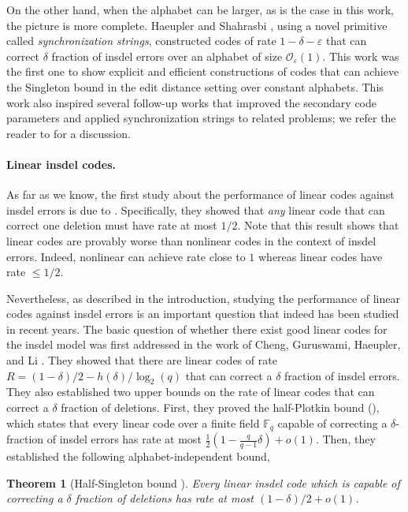 \documentclass[11pt]{article}
\theoremstyle{plain}
\newtheorem{thm}{Theorem}
\theoremstyle{definition}
\theoremstyle{remark}
\newcommand{\cO}{\mathcal{O}}
\renewcommand{\epsilon}{\varepsilon}
\newcommand{\Fq}{\mathbb{F}_q}
\begin{document}
    On the other hand, when the alphabet can be larger, as is the case in this work, the picture is more complete.
    Haeupler and Shahrasbi \cite{haeupler2021synchronization-org}, using a novel primitive called \emph{synchronization strings}, constructed codes of rate $1 - \delta - \varepsilon$ that can correct $\delta$ fraction of insdel errors over an alphabet of size $\cO_{\epsilon}(1)$. 
    This work was the first one to show explicit and efficient constructions of codes that can achieve the Singleton bound in the edit distance setting over constant alphabets.
    This work also inspired several follow-up works that improved the secondary code parameters and applied synchronization strings to related problems; we refer the reader to \cite{haeupler2021synchronization} for a discussion.


    
    \paragraph{Linear insdel codes.}

    As far as we know, the first study about the performance of linear codes against insdel errors is due to \cite{abdel2007linear}. Specifically, they showed that \emph{any} linear code that can correct one deletion must have rate at most $1/2$. 
    Note that this result shows that linear codes are provably worse than nonlinear codes in the context of insdel errors. Indeed, nonlinear can achieve rate close to $1$ whereas linear codes have rate $\leq 1/2$. 
    
    Nevertheless, as described in the introduction, studying the performance of linear codes against insdel errors is an important question that indeed has been studied in recent years. 
    The basic question of whether there exist good linear codes for the insdel model was first addressed in the work of Cheng, Guruswami, Haeupler, and Li \cite{cheng2020efficient}. They showed that there are linear codes of rate $R = (1-\delta)/2 - h(\delta)/\log_2(q)$ that can correct a $\delta$ fraction of insdel errors. 
    They also established two upper bounds on the rate of linear codes that can correct a $\delta$ fraction of deletions. First, they proved the half-Plotkin bound (\cite[Theorem 5.1]{cheng2020efficient}), which states that every linear code over a finite field $\Fq$ capable of correcting a $\delta$-fraction of insdel errors has rate at most $\frac{1}{2} \left( 1 - \frac{q}{q-1} \delta \right) + o(1)$.
    Then, they established the following alphabet-independent bound, 
    \begin{thm}[{Half-Singleton bound \cite[Corollary 5.2]{cheng2020efficient}}]
		Every linear insdel code which is capable of correcting a $\delta$ fraction of deletions has rate at most $(1-\delta)/2 + o(1)$.
\end{thm}
\end{document}
